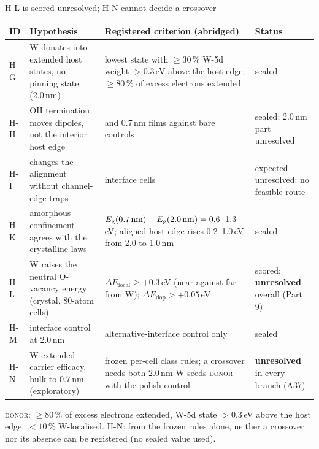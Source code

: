 \begin{frame}{H-L is scored unresolved; H-N cannot decide a crossover}
  \threeTop
  \begingroup\scriptsize
  \setlength{\tabcolsep}{4pt}
  \renewcommand{\arraystretch}{1.0}
  \begin{tabularx}{\textwidth}{@{}>{\raggedright\arraybackslash}p{0.6cm}>{\raggedright\arraybackslash}p{3.9cm}%
      >{\raggedright\arraybackslash}X>{\raggedright\arraybackslash}p{2.9cm}@{}}
    \toprule
    ID & Hypothesis & Registered criterion (abridged) & Status \\
    \midrule
    H-G & W donates into extended host states, no pinning state (2.0\,nm) & lowest state with $\ge 30$\,\% W-5d
      weight $> 0.3$\,eV above the host edge; $\ge 80$\,\% of excess electrons extended & sealed \\
    H-H & OH termination moves dipoles, not the interior host edge & 2.0 and 0.7\,nm films against bare controls &
      sealed; 2.0\,nm part unresolved \\
    H-I & \AlO{} changes the alignment without channel-edge traps & interface cells & expected unresolved: no
      feasible route \\
    H-K & amorphous confinement agrees with the crystalline laws & $E_{\mathrm{g}}(0.7\,\mathrm{nm})-E_{\mathrm{g}}(2.0\,\mathrm{nm}) =
      0.6$--1.3\,eV; aligned host edge rises 0.2--1.0\,eV from 2.0 to 1.0\,nm & sealed \\
    H-L & W raises the neutral O-vacancy energy (crystal, 80-atom cells) & $\Delta E_\mathrm{local} \ge +0.3$\,eV (near
      against far from W); $\Delta E_\mathrm{dop} > +0.05$\,eV & scored: \textbf{unresolved} overall (Part 9) \\
    H-M & \HfO{} interface control at 2.0\,nm & alternative-interface control only & sealed \\
    H-N & W extended-carrier efficacy, bulk to 0.7\,nm (exploratory) & frozen per-cell class rules; a crossover
      needs both 2.0\,nm W seeds \textsc{donor} with the polish control & \textbf{unresolved} in every branch
      (A37) \\
    \bottomrule
  \end{tabularx}\par\endgroup
  \vspace{0.3mm}
  \begingroup\scriptsize \textsc{donor}: $\ge 80$\,\% of excess electrons extended, W-5d state $> 0.3$\,eV above the
    host edge, $< 10$\,\% W-localised. H-N: from the frozen rules alone, neither a crossover nor its absence can
    be registered (no sealed value used).\par\endgroup
\end{frame}

